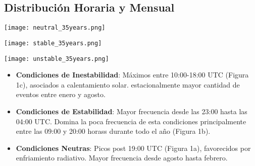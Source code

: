 \documentclass[11pt]{article}
\begin{document}
\subsection{Distribución Horaria y Mensual}
\begin{center}
    \begin{minipage}{0.49\textwidth}
        \centering
        \texttt{[image: neutral\_35years.png]}
    \end{minipage}
    \hfill
    \begin{minipage}{0.49\textwidth}
        \centering
        \texttt{[image: stable\_35years.png]}
    \end{minipage}

    \vspace{0.5cm}
    \texttt{[image: unstable\_35years.png]}
    
    \label{fig:clima}
\end{center}
\begin{itemize}
    \item \textbf{Condiciones de Inestabilidad}: Máximos entre 10:00-18:00 UTC (Figura 1c), asociados a calentamiento solar. estacionalmente mayor cantidad de eventos entre enero y agosto.
    \item \textbf{Condiciones de Estabilidad}: Mayor frecuencia desde las 23:00 hasta las 04:00 UTC. Domina la poca frecuencia de esta condiciones principalmente entre las 09:00 y 20:00 horass durante todo el año (Figura 1b).
    \item \textbf{Condiciones Neutras}: Picos post 19:00 UTC (Figura 1a), favorecidos por enfriamiento radiativo. Mayor frecuencia desde agosto hasta febrero.
    
\end{itemize}



\end{document}
